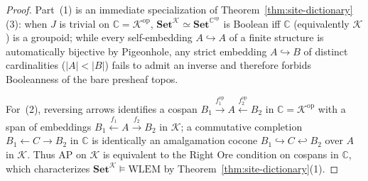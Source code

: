 \begin{proof}
Part~(1) is an immediate specialization of Theorem~\ref{thm:site-dictionary}(3): when $J$ is trivial on $\mathbb{C} = \mathcal{K}^{\mathrm{op}}$, $\mathbf{Set}^{\mathcal{K}} \simeq \mathbf{Set}^{\mathbb{C}^{\mathrm{op}}}$ is Boolean iff $\mathbb{C}$ (equivalently $\mathcal{K}$) is a groupoid; while every self-embedding $A \hookrightarrow A$ of a finite structure is automatically bijective by Pigeonhole, any strict embedding $A \hookrightarrow B$ of distinct cardinalities ($|A| < |B|$) fails to admit an inverse and therefore forbids Booleanness of the bare presheaf topos.

For~(2), reversing arrows identifies a cospan $B_1 \xrightarrow{f_1^{\mathrm{op}}} A \xleftarrow{f_2^{\mathrm{op}}} B_2$ in $\mathbb{C} = \mathcal{K}^{\mathrm{op}}$ with a span of embeddings $B_1 \xleftarrow{f_1} A \xrightarrow{f_2} B_2$ in $\mathcal{K}$; a commutative completion $B_1 \leftarrow C \rightarrow B_2$ in $\mathbb{C}$ is identically an amalgamation cocone $B_1 \hookrightarrow C \hookleftarrow B_2$ over $A$ in $\mathcal{K}$. Thus $\mathrm{AP}$ on $\mathcal{K}$ is equivalent to the Right Ore condition on cospans in $\mathbb{C}$, which characterizes $\mathbf{Set}^{\mathcal{K}} \models \mathrm{WLEM}$ by Theorem~\ref{thm:site-dictionary}(1).


\end{proof}
